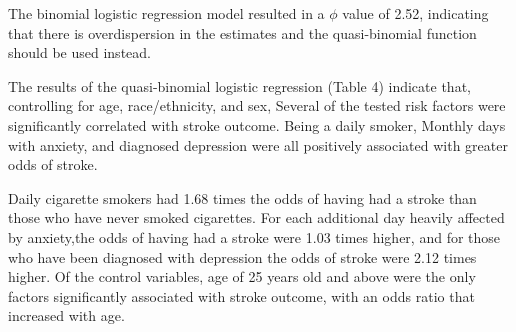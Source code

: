 \documentclass[11pt,]{article}
\begin{document}
The binomial logistic regression model resulted in a \(\phi\) value of
2.52, indicating that there is overdispersion in the estimates and the
quasi-binomial function should be used instead.

The results of the quasi-binomial logistic regression (Table 4) indicate
that, controlling for age, race/ethnicity, and sex, Several of the
tested risk factors were significantly correlated with stroke outcome.
Being a daily smoker, Monthly days with anxiety, and diagnosed
depression were all positively associated with greater odds of stroke.

Daily cigarette smokers had 1.68 times the odds of having had a stroke
than those who have never smoked cigarettes. For each additional day
heavily affected by anxiety,the odds of having had a stroke were 1.03
times higher, and for those who have been diagnosed with depression the
odds of stroke were 2.12 times higher. Of the control variables, age of
25 years old and above were the only factors significantly associated
with stroke outcome, with an odds ratio that increased with age.
\end{document}
